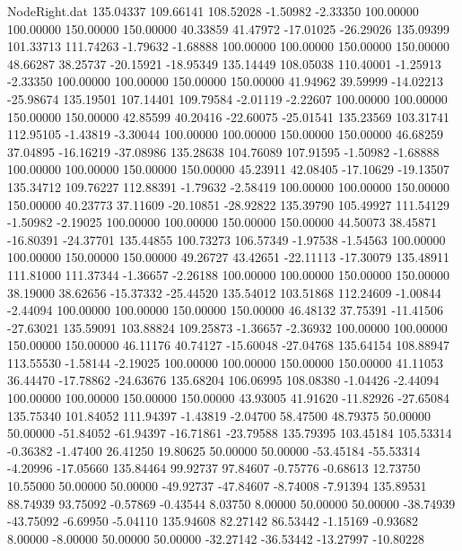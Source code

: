 \begin{filecontents}{NodeRight.dat}
 135.04337  109.66141  108.52028    -1.50982   -2.33350  100.00000  100.00000  150.00000  150.00000   40.33859   41.47972  -17.01025  -26.29026
 135.09399  101.33713  111.74263    -1.79632   -1.68888  100.00000  100.00000  150.00000  150.00000   48.66287   38.25737  -20.15921  -18.95349
 135.14449  108.05038  110.40001    -1.25913   -2.33350  100.00000  100.00000  150.00000  150.00000   41.94962   39.59999  -14.02213  -25.98674
 135.19501  107.14401  109.79584    -2.01119   -2.22607  100.00000  100.00000  150.00000  150.00000   42.85599   40.20416  -22.60075  -25.01541
 135.23569  103.31741  112.95105    -1.43819   -3.30044  100.00000  100.00000  150.00000  150.00000   46.68259   37.04895  -16.16219  -37.08986
 135.28638  104.76089  107.91595    -1.50982   -1.68888  100.00000  100.00000  150.00000  150.00000   45.23911   42.08405  -17.10629  -19.13507
 135.34712  109.76227  112.88391    -1.79632   -2.58419  100.00000  100.00000  150.00000  150.00000   40.23773   37.11609  -20.10851  -28.92822
 135.39790  105.49927  111.54129    -1.50982   -2.19025  100.00000  100.00000  150.00000  150.00000   44.50073   38.45871  -16.80391  -24.37701
 135.44855  100.73273  106.57349    -1.97538   -1.54563  100.00000  100.00000  150.00000  150.00000   49.26727   43.42651  -22.11113  -17.30079
 135.48911  111.81000  111.37344    -1.36657   -2.26188  100.00000  100.00000  150.00000  150.00000   38.19000   38.62656  -15.37332  -25.44520
 135.54012  103.51868  112.24609    -1.00844   -2.44094  100.00000  100.00000  150.00000  150.00000   46.48132   37.75391  -11.41506  -27.63021
 135.59091  103.88824  109.25873    -1.36657   -2.36932  100.00000  100.00000  150.00000  150.00000   46.11176   40.74127  -15.60048  -27.04768
 135.64154  108.88947  113.55530    -1.58144   -2.19025  100.00000  100.00000  150.00000  150.00000   41.11053   36.44470  -17.78862  -24.63676
 135.68204  106.06995  108.08380    -1.04426   -2.44094  100.00000  100.00000  150.00000  150.00000   43.93005   41.91620  -11.82926  -27.65084
 135.75340  101.84052  111.94397    -1.43819   -2.04700   58.47500   48.79375   50.00000   50.00000  -51.84052  -61.94397  -16.71861  -23.79588
 135.79395  103.45184  105.53314    -0.36382   -1.47400   26.41250   19.80625   50.00000   50.00000  -53.45184  -55.53314   -4.20996  -17.05660
 135.84464   99.92737   97.84607    -0.75776   -0.68613   12.73750   10.55000   50.00000   50.00000  -49.92737  -47.84607   -8.74008   -7.91394
 135.89531   88.74939   93.75092    -0.57869   -0.43544    8.03750    8.00000   50.00000   50.00000  -38.74939  -43.75092   -6.69950   -5.04110
 135.94608   82.27142   86.53442    -1.15169   -0.93682    8.00000   -8.00000   50.00000   50.00000  -32.27142  -36.53442  -13.27997  -10.80228

\end{filecontents}
